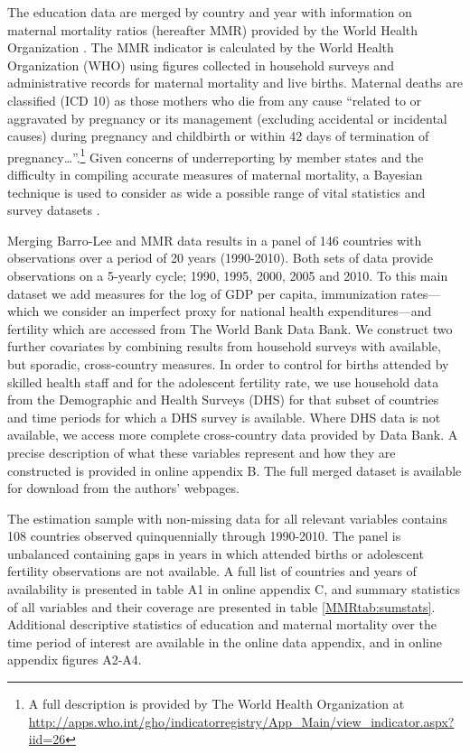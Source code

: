 \documentclass{article}[12pt,subeqn]
\begin{document}
\begin{spacing}{1.4}
The education data are merged by country and year with information on maternal 
mortality ratios (hereafter MMR) provided by the World Health Organization 
\citep{WHO2012}. The MMR indicator is calculated by the World Health 
Organization (WHO) using figures collected in household surveys and 
administrative records for maternal mortality and live births. Maternal 
deaths are classified (ICD 10) as those mothers who die from any cause ``related 
to or aggravated by pregnancy or its management (excluding accidental or 
incidental causes) during pregnancy and childbirth or within 42 days of 
termination of pregnancy\ldots''.\footnote{A full description is provided by 
The World Health Organization at 
\url{http://apps.who.int/gho/indicatorregistry/App_Main/view_indicator.aspx?iid=26}} 
Given concerns of underreporting by member states and the difficulty in compiling 
accurate measures of maternal mortality, a Bayesian technique is used to consider
as wide a possible range of vital statistics and survey datasets
\citep{Alkemaetal2015}.

Merging Barro-Lee and MMR data results in a panel of 146 countries with 
observations over a period of 20 years (1990-2010). Both sets of data provide 
observations on a 5-yearly cycle; 1990, 1995, 2000, 2005 and 2010. To this main 
dataset we add measures for the log of GDP per capita, immunization rates---which 
we consider an imperfect proxy for national health expenditures---and fertility 
which are accessed from The World Bank Data Bank. We construct two further 
covariates by combining results from household surveys with available, but
sporadic, cross-country measures. In order to control for births attended by skilled
health staff and for the adolescent fertility rate, we use household data from the
Demographic and Health Surveys (DHS) for that subset of countries and time periods for
which a DHS survey is available. Where DHS data is not available, we access more
complete cross-country data provided by \citet{WorldBank2012} Data Bank. A precise
description of what these variables represent and how they are constructed is
provided in online appendix B.  The full merged dataset is available for download
from the authors' webpages.

The estimation sample with non-missing data for all relevant variables contains 
108 countries observed quinquennially through 1990-2010. The panel is unbalanced 
containing gaps in years in which attended births or adolescent fertility 
observations are not available. A full list of countries and years of 
availability is presented in table A1 in online appendix C, and summary statistics
of all variables and their coverage are presented in table \ref{MMRtab:sumstats}.
Additional descriptive statistics of education and maternal mortality over the
time period of interest are available in the online data appendix, and in online
appendix figures A2-A4.


\end{spacing}
\end{document}
